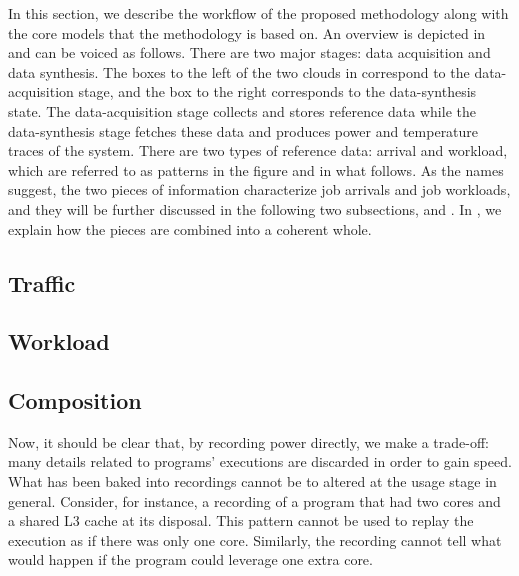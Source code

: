 In this section, we describe the workflow of the proposed methodology along with
the core models that the methodology is based on. An overview is depicted in
 and can be voiced as follows. There are two major stages:
data acquisition and data synthesis. The boxes to the left of the two clouds in
 correspond to the data-acquisition stage, and the box to the
right corresponds to the data-synthesis state. The data-acquisition stage
collects and stores reference data while the data-synthesis stage fetches these
data and produces power and temperature traces of the system. There are two
types of reference data: arrival and workload, which are referred to as patterns
in the figure and in what follows. As the names suggest, the two pieces of
information characterize job arrivals and job workloads, and they will be
further discussed in the following two subsections,  and
. In , we explain how the pieces are combined
into a coherent whole.

\subsection{Traffic} 


\subsection{Workload} 


\subsection{Composition} 

Now, it should be clear that, by recording power directly, we make a trade-off:
many details related to programs' executions are discarded in order to gain
speed. What has been baked into recordings cannot be to altered at the usage
stage in general. Consider, for instance, a recording of a program that had two
cores and a shared L3 cache at its disposal. This pattern cannot be used to
replay the execution as if there was only one core. Similarly, the recording
cannot tell what would happen if the program could leverage one extra core.
